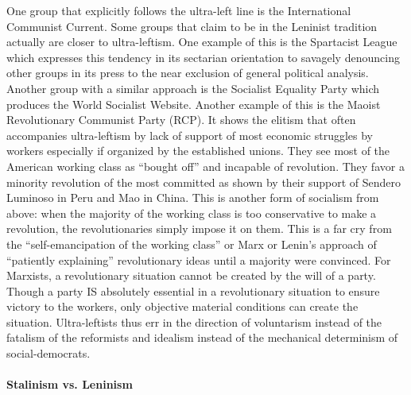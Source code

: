 One group that explicitly follows the ultra-left line is the International Communist Current. Some groups that claim to be in the Leninist tradition actually are closer to ultra-leftism. One example of this is the Spartacist League which expresses this tendency in its sectarian orientation to savagely denouncing other groups in its press to the near exclusion of general political analysis. Another group with a similar approach is the Socialist Equality Party which produces the World Socialist Website. Another example of this is the Maoist Revolutionary Communist Party (RCP). It shows the elitism that often accompanies ultra-leftism by lack of support of most economic struggles by workers especially if organized by the established unions. They see most of the American working class as ``bought off'' and incapable of revolution. They favor a minority revolution of the most committed as shown by their support of Sendero Luminoso in Peru and Mao in China. This is another form of socialism from above: when the majority of the working class is too conservative to make a revolution, the revolutionaries simply impose it on them. This is a far cry from the ``self-emancipation of the working class'' or Marx or Lenin's approach of ``patiently explaining'' revolutionary ideas until a majority were convinced. For Marxists, a revolutionary situation cannot be created by the will of a party. Though a party IS absolutely essential in a revolutionary situation to ensure victory to the workers, only objective material conditions can create the situation. Ultra-leftists thus err in the direction of voluntarism instead of the fatalism of the reformists and idealism instead of the mechanical determinism of social-democrats.

\paragraph{Stalinism vs. Leninism}

